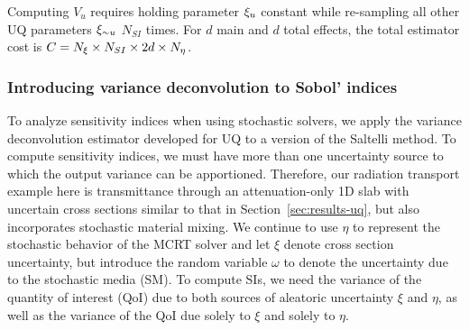 Computing $V_u$ requires holding parameter ${\xi_u}$ constant while re-sampling all other UQ parameters ${\xi_{\sim u}}$ $N_{SI}$ times. %
For $d$ main and $d$ total effects, the total estimator cost is $C = {N_\xi} \times N_{SI} \times 2d \times {N_\eta}$. 

\subsubsection{Introducing variance deconvolution to Sobol' indices}
To analyze sensitivity indices when using stochastic solvers, we apply the variance deconvolution estimator developed for UQ to a version of the Saltelli method. To compute sensitivity indices, we must have more than one uncertainty source to which the output variance can be apportioned. Therefore, our radiation transport example here is  transmittance through an attenuation-only 1D slab with uncertain cross sections similar to that in Section~\ref{sec:results-uq}, but also incorporates stochastic material mixing. We continue to use $\eta$ to represent the stochastic behavior of the MCRT solver and let $\xi$ denote cross section uncertainty, but introduce the random variable $\omega$ to denote the uncertainty due to the stochastic media (SM). To compute SIs, we need the variance of the quantity of interest (QoI) due to both sources of aleatoric uncertainty $\xi$ and $\eta$, as well as the variance of the QoI due solely to $\xi$ and solely to $\eta$.


